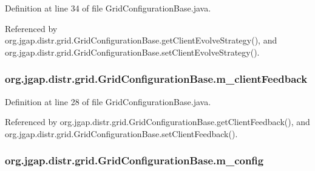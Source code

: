 Definition at line 34 of file Grid\-Configuration\-Base.\-java.



Referenced by org.\-jgap.\-distr.\-grid.\-Grid\-Configuration\-Base.\-get\-Client\-Evolve\-Strategy(), and org.\-jgap.\-distr.\-grid.\-Grid\-Configuration\-Base.\-set\-Client\-Evolve\-Strategy().

\hypertarget{classorg_1_1jgap_1_1distr_1_1grid_1_1_grid_configuration_base_a51fd3827dc91a34a92488f766dbf5bba}{
\subsubsection[{m\-\_\-client\-Feedback}]{ org.\-jgap.\-distr.\-grid.\-Grid\-Configuration\-Base.\-m\-\_\-client\-Feedback\hspace{0.3cm}{\ttfamily [private]}}}\label{classorg_1_1jgap_1_1distr_1_1grid_1_1_grid_configuration_base_a51fd3827dc91a34a92488f766dbf5bba}


Definition at line 28 of file Grid\-Configuration\-Base.\-java.



Referenced by org.\-jgap.\-distr.\-grid.\-Grid\-Configuration\-Base.\-get\-Client\-Feedback(), and org.\-jgap.\-distr.\-grid.\-Grid\-Configuration\-Base.\-set\-Client\-Feedback().

\hypertarget{classorg_1_1jgap_1_1distr_1_1grid_1_1_grid_configuration_base_ab5b34ed9271831de47eaaf54d244716a}{
\subsubsection[{m\-\_\-config}]{ org.\-jgap.\-distr.\-grid.\-Grid\-Configuration\-Base.\-m\-\_\-config\hspace{0.3cm}{\ttfamily [private]}}}\label{classorg_1_1jgap_1_1distr_1_1grid_1_1_grid_configuration_base_ab5b34ed9271831de47eaaf54d244716a}


